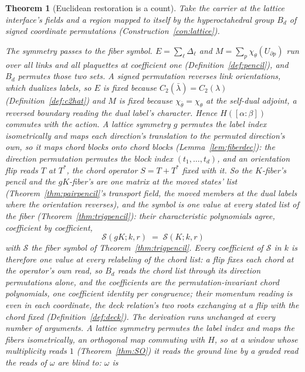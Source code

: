 \documentclass[11pt]{article}
\newtheorem{theorem}{Theorem}
\theoremstyle{definition}
\begin{document}
\begin{theorem}[Euclidean restoration is a count]\label{thm:restoration}
Take the carrier at the lattice interface's fields and a region
mapped to itself by the hyperoctahedral group $B_d$ of signed
coordinate permutations (Construction~\ref{con:lattice}).

\emph{The symmetry passes to the fiber symbol.} $E=\sum_\ell\Delta_\ell$ and
$M=\sum_p\chi_\theta(U_{\partial p})$ run over all links and all plaquettes at
coefficient one (Definition~\ref{def:pencil}), and $B_d$ permutes those two
sets. A signed permutation reverses link orientations, which dualizes labels, so
$E$ is fixed because $C_2(\bar\lambda)=C_2(\lambda)$
(Definition~\ref{def:c2hat}) and $M$ is fixed because
$\chi_{\bar\theta}=\chi_\theta$ at the self-dual adjoint, a
reversed boundary reading the dual label's character. Hence
$H([\alpha\!:\!\beta])$ commutes with the action. A lattice symmetry
$g$ permutes the label index isometrically and maps each direction's
translation to the permuted direction's own, so it maps chord blocks
onto chord blocks (Lemma~\ref{lem:fiberdec}): the direction
permutation permutes the block index $(t_1,\dots,t_d)$, and an
orientation flip reads $T$ at $T^{*}$, the chord operator
$S=T+T^{*}$ fixed with it. So the $K$-fiber's pencil and the
$gK$-fiber's are one matrix at the moved states' list
(Theorem~\ref{thm:pairpencil}'s transport field, the moved
members at the dual labels where the orientation reverses), and the
symbol is one value at every stated list of the fiber
(Theorem~\ref{thm:trigpencil}): their characteristic polynomials
agree, coefficient by coefficient,
\[
\mathcal S(gK;k,r)\;=\;\mathcal S(K;k,r)
\]
with $\mathcal S$ the fiber symbol of Theorem~\ref{thm:trigpencil}. Every
coefficient of $\mathcal S$ in $k$ is therefore one value at every
relabeling of the chord list: a flip fixes each chord at the
operator's own read, so $B_d$ reads the chord list through its
direction permutations alone, and the coefficients are the
permutation-invariant chord polynomials, one coefficient identity
per congruence; their momentum reading is even in each coordinate,
the deck relation's two roots exchanging at a flip with the chord
fixed (Definition~\ref{def:deck}). The derivation runs unchanged at every number of
arguments. A lattice symmetry permutes the label index and maps the
fibers isometrically, an orthogonal map commuting with $H$, so at a
window whose multiplicity reads $1$ (Theorem~\ref{thm:SO}) it reads the
ground line by a graded read the reads of $\omega$ are blind to:
$\omega$ is

\end{theorem}
\end{document}

